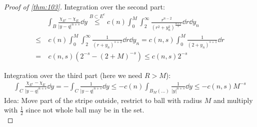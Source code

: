 \begin{proof}[Proof of \cref{thm:103}]
	Integration over the second part:
	\begin{align*}
		     & \int_B \frac{\chi_{E^c} -\chi_E}{\lvert y-q\rvert^{n+s}} \dd{y} \overset{B \subset E^c}{ \leq} c(n) \int_0^M \int_2^\infty \frac{r^{n-2}}{(r^2 +y_n^2)^{\frac{n+s}{2}}} \dd{r} \dd{y_n} \\
		\leq & \ c(n) \int_0^M \int_2^\infty \frac{1}{( r+y_n)^{s+2}} \dd{r} \dd{y_n} = c(n,s) \int_0^M \frac{1}{(2+y_n)^{s+1}} \dd{r} \\
		=    & \ c(n,s)(2^{-s}-(2+M)^{-s}) \leq c(n,s) 2^{-s}
	\end{align*}

	Integration over the third part (here we need \( R > M \)):
	\begin{align*}
		\int_C \frac{\chi_{E^c} -\chi_E}{\lvert y-q\rvert^{n+s}} \dd{y} = - \int_C \frac{1}{\lvert y-q \rvert^{n+s}} \dd{y} \leq -c(n) \int_{B_M (\ldots)} \frac{1}{\lvert y\rvert^{n+s}} \dd{y} \leq -c(n,s) M^{-s}
	\end{align*}
	Idea: Move part of the stripe outside, restrict to ball with radius \( M \) and
	multiply with \( \frac{1}{2} \) since not whole ball may be in the set.\\


\end{proof}
